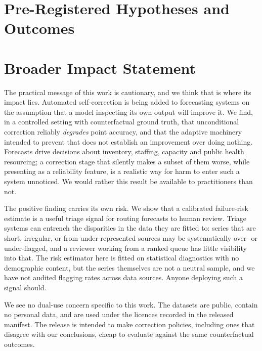 \section*{Pre-Registered Hypotheses and Outcomes}

\begin{table}[htbp]
\centering
\caption{Every pre-registered hypothesis and its verdict, with what each verdict
does and does not mean. The analysis plan was fixed before any experiment was run.
Several ``supported'' verdicts are weak, and the last column says why rather than
leaving it to the reader.}
\label{tab:hypotheses}
\small
\fittable{}
\end{table}

\section*{Broader Impact Statement}

The practical message of this work is cautionary, and we think that is where its impact
lies. Automated self-correction is being added to forecasting systems on the assumption
that a model inspecting its own output will improve it. We find, in a controlled setting
with counterfactual ground truth, that unconditional correction reliably \emph{degrades}
point accuracy, and that the adaptive machinery intended to prevent that does not
establish an improvement over doing nothing. Forecasts drive decisions about inventory,
staffing, capacity and public health resourcing; a correction stage that silently makes
a subset of them worse, while presenting as a reliability feature, is a realistic way for
harm to enter such a system unnoticed. We would rather this result be available to
practitioners than not.

The positive finding carries its own risk. We show that a calibrated failure-risk
estimate is a useful triage signal for routing forecasts to human review. Triage systems
can entrench the disparities in the data they are fitted to: series that are short,
irregular, or from under-represented sources may be systematically over- or
under-flagged, and a reviewer working from a ranked queue has little visibility into
that. The risk estimator here is fitted on statistical diagnostics with no demographic
content, but the series themselves are not a neutral sample, and we have not audited
flagging rates across data sources. Anyone deploying such a signal should.

We see no dual-use concern specific to this work. The datasets are public, contain no
personal data, and are used under the licences recorded in the released manifest. The
release is intended to make correction policies, including ones that disagree with our
conclusions, cheap to evaluate against the same counterfactual outcomes.

